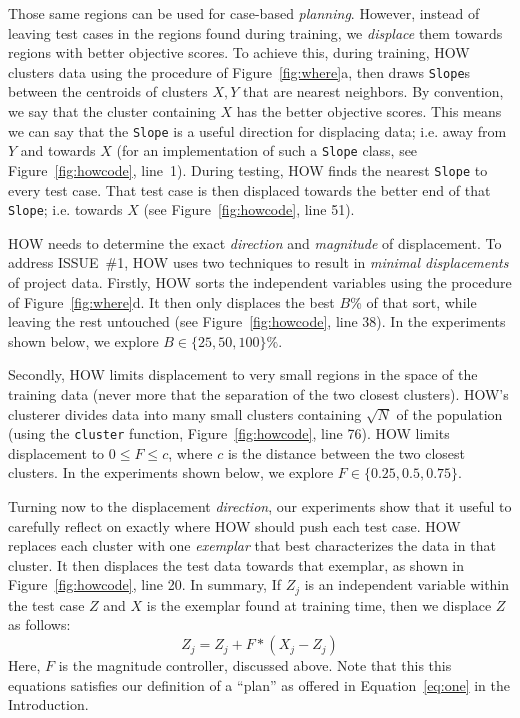 \documentclass[conference]{IEEEtran}
\newcommand{\eq}[1]{Equation~\ref{eq:#1}}
\newcommand{\fig}[1]{Figure~\ref{fig:#1}}
\begin{document}




Those same regions can be used for case-based 
{\em planning}. However,  instead of leaving test cases in the regions
found during training, we {\em displace} them towards regions
with better objective scores.
To achieve this, 
during training, HOW clusters data using the procedure of \fig{where}a,
then draws {\tt Slope}s between the centroids of  clusters $X,Y$ that are nearest
neighbors.
By convention, we say that the cluster containing $X$ has the  better objective scores. This means we can say that the {\tt Slope} is a useful direction for displacing
data; i.e.  away from $Y$ and towards $X$ (for an implementation of such a {\tt Slope} class, see \fig{howcode}, line~1).
 During testing,  HOW   finds the  nearest {\tt Slope} to every test case. That  test case is   then displaced towards the better end
of that {\tt Slope}; i.e. towards  $X$ (see \fig{howcode}, line 51).

 HOW needs to  determine the  exact {\em direction} and {\em magnitude} of 
displacement.  To address  ISSUE~\#1,
HOW uses two techniques to result in 
{\em minimal displacements} of project data. Firstly,
HOW sorts  the independent variables
using the procedure of  \fig{where}d. It then only
displaces the    best $B$\%  of that sort, while leaving the rest untouched
(see \fig{howcode}, line 38).
In  the experiments shown below,  we explore   \mbox{$B \in \{25,50,100\}\%$}.

Secondly, HOW   limits displacement
to very small regions in the space of the training data (never more that the separation
of the two closest clusters).  HOW's clusterer divides  data into many   small clusters containing
$\sqrt{N}$ of the population (using the {\tt cluster} function, \fig{howcode}, line 76).
HOW   limits displacement to  \mbox{$0 \le F \le c$}, where
$c$ is the distance between the two closest clusters. 
In  the experiments shown below,  we explore
\mbox{$F\in \{0.25, 0.5, 0.75\}$}.

Turning now to the displacement {\em direction},
our experiments show that it useful to  carefully reflect on exactly where HOW should  push each test case.
HOW replaces each cluster   with one {\em exemplar} that best
characterizes the data in that cluster. It then displaces the
test data towards that exemplar, as shown in \fig{howcode}, line 20. In summary, 
If  $Z_j$ is an independent variable within the
test case $Z$ and  $X$ is the exemplar found at training time,
then we displace $Z$ as follows:
\[Z_j =  Z_j + F*(X_j - Z_j)\]
Here, $F$ is the  magnitude controller, discussed above. Note that this
this equations satisfies our definition of a ``plan'' as offered in
\eq{one} in the  Introduction.
\end{document}
